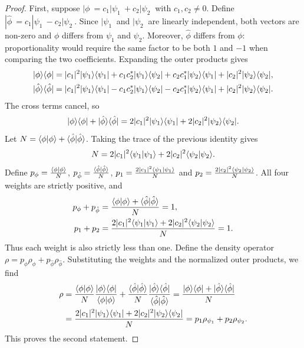 \documentclass{techbrief}
\begin{document}
\begin{proof}
	First, suppose $|\phi\>=c_1|\psi_1\>+c_2|\psi_2\>$ with $c_1,c_2\neq0$. Define $|\hat{\phi}\>=c_1|\psi_1\>-c_2|\psi_2\>$. Since $|\psi_1\>$ and $|\psi_2\>$ are linearly independent, both vectors are non-zero and $\phi$ differs from $\psi_1$ and $\psi_2$. Moreover, $\hat{\phi}$ differs from $\phi$: proportionality would require the same factor to be both $1$ and $-1$ when comparing the two coefficients. Expanding the outer products gives
	\begin{equation*}
		\begin{aligned}
			|\phi\rangle\langle\phi|
			&=|c_1|^2|\psi_1\rangle\langle\psi_1|
			+c_1c_2^*|\psi_1\rangle\langle\psi_2|  +c_2c_1^*|\psi_2\rangle\langle\psi_1|
			+|c_2|^2|\psi_2\rangle\langle\psi_2|,\\
			|\hat{\phi}\rangle\langle\hat{\phi}|
			&=|c_1|^2|\psi_1\rangle\langle\psi_1|
			-c_1c_2^*|\psi_1\rangle\langle\psi_2|-c_2c_1^*|\psi_2\rangle\langle\psi_1|
			+|c_2|^2|\psi_2\rangle\langle\psi_2|.
		\end{aligned}
	\end{equation*}
	The cross terms cancel, so
	\begin{equation*}
		|\phi\rangle\langle\phi|+|\hat{\phi}\rangle\langle\hat{\phi}|
		=2|c_1|^2|\psi_1\rangle\langle\psi_1|
		+2|c_2|^2|\psi_2\rangle\langle\psi_2|.
	\end{equation*}
	Let $N=\langle\phi|\phi\rangle+\langle\hat{\phi}|\hat{\phi}\rangle$. Taking the trace of the previous identity gives
	\begin{equation*}
		N=2|c_1|^2\langle\psi_1|\psi_1\rangle
		+2|c_2|^2\langle\psi_2|\psi_2\rangle.
	\end{equation*}
	Define $p_\phi=\frac{\langle\phi|\phi\rangle}{N}$, $p_{\hat{\phi}}=\frac{\langle\hat{\phi}|\hat{\phi}\rangle}{N}$, $p_1=\frac{2|c_1|^2\langle\psi_1|\psi_1\rangle}{N}$ and $p_2=\frac{2|c_2|^2\langle\psi_2|\psi_2\rangle}{N}$. All four weights are strictly positive, and
	\begin{equation*}
		\begin{aligned}
			p_\phi+p_{\hat{\phi}}
			&=\frac{\langle\phi|\phi\rangle+\langle\hat{\phi}|\hat{\phi}\rangle}{N}=1,\\
			p_1+p_2
			&=\frac{2|c_1|^2\langle\psi_1|\psi_1\rangle
			+2|c_2|^2\langle\psi_2|\psi_2\rangle}{N}=1.
		\end{aligned}
	\end{equation*}
	Thus each weight is also strictly less than one. Define the density operator $\rho=p_\phi\rho_\phi+p_{\hat{\phi}}\rho_{\hat{\phi}}$. Substituting the weights and the normalized outer products, we find
	\begin{equation*}
		\begin{aligned}
			\rho
			&=\frac{\langle\phi|\phi\rangle}{N}
			\frac{|\phi\rangle\langle\phi|}{\langle\phi|\phi\rangle}
			+\frac{\langle\hat{\phi}|\hat{\phi}\rangle}{N}
			\frac{|\hat{\phi}\rangle\langle\hat{\phi}|}{\langle\hat{\phi}|\hat{\phi}\rangle} =\frac{|\phi\rangle\langle\phi|+|\hat{\phi}\rangle\langle\hat{\phi}|}{N}\\
			&=\frac{2|c_1|^2|\psi_1\rangle\langle\psi_1|
			+2|c_2|^2|\psi_2\rangle\langle\psi_2|}{N} =p_1\rho_{\psi_1}+p_2\rho_{\psi_2}.
		\end{aligned}
	\end{equation*}
	This proves the second statement.


\end{proof}
\end{document}
